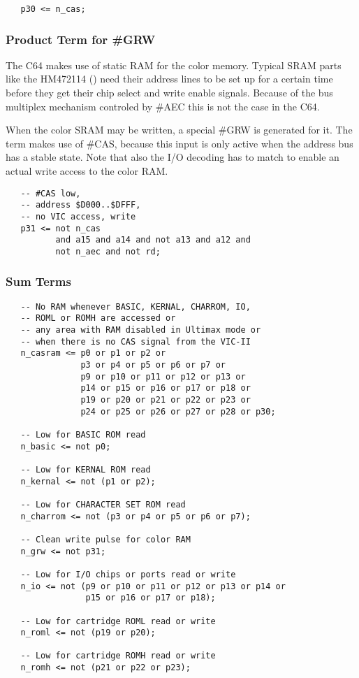 \begin{lstlisting}
   p30 <= n_cas;
\end{lstlisting}

\subsubsection{Product Term for \#GRW}

The C64 makes use of static RAM for the color memory. Typical SRAM parts
like the HM472114 (\cite{Hita2114}) need their address lines to be set up for a
certain time before they get their chip select and write enable signals.
Because of the bus multiplex mechanism controled by \#AEC this is not the
case in the C64.

When the color SRAM may be written, a special \#GRW is generated for it. The
term makes use of \#CAS, because this input is only active when the address
bus has a stable state. Note that also the I/O decoding has to match to
enable an actual write access to the color RAM.

\begin{lstlisting}
   -- #CAS low,
   -- address $D000..$DFFF,
   -- no VIC access, write
   p31 <= not n_cas
          and a15 and a14 and not a13 and a12 and
          not n_aec and not rd;
\end{lstlisting}

\subsubsection{Sum Terms}

\begin{lstlisting}
   -- No RAM whenever BASIC, KERNAL, CHARROM, IO,
   -- ROML or ROMH are accessed or
   -- any area with RAM disabled in Ultimax mode or
   -- when there is no CAS signal from the VIC-II
   n_casram <= p0 or p1 or p2 or
               p3 or p4 or p5 or p6 or p7 or
               p9 or p10 or p11 or p12 or p13 or
               p14 or p15 or p16 or p17 or p18 or
               p19 or p20 or p21 or p22 or p23 or
               p24 or p25 or p26 or p27 or p28 or p30;

   -- Low for BASIC ROM read
   n_basic <= not p0;

   -- Low for KERNAL ROM read
   n_kernal <= not (p1 or p2);

   -- Low for CHARACTER SET ROM read
   n_charrom <= not (p3 or p4 or p5 or p6 or p7);

   -- Clean write pulse for color RAM
   n_grw <= not p31;

   -- Low for I/O chips or ports read or write
   n_io <= not (p9 or p10 or p11 or p12 or p13 or p14 or
                p15 or p16 or p17 or p18);

   -- Low for cartridge ROML read or write
   n_roml <= not (p19 or p20);

   -- Low for cartridge ROMH read or write
   n_romh <= not (p21 or p22 or p23);
\end{lstlisting}

